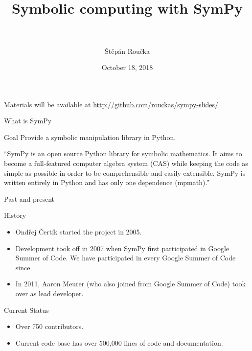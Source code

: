 \documentclass[aspectratio=169,xcolor=svgnames]{beamer}
\title[SymPy\hspace{4em}\insertframenumber/
\inserttotalframenumber]{~\\ Symbolic computing with SymPy \\~}
\author[Š. Roučka]
{Štěpán Roučka}
\institute{\pgfuseimage{mylogo}}
\date{October 18, 2018}
\begin{document}
\begin{frame}
  \maketitle
\begin{center}
\normalsize Materials will be available at \url{http://github.com/rouckas/sympy-slides/}
\end{center}
\end{frame}


\begin{frame}{What is SymPy}
  \begin{block}{Goal}
    Provide a symbolic manipulation library in Python.
  \end{block}
  \begin{block}

    ``SymPy is an open source Python library for symbolic mathematics. It aims to
    become a full-featured computer algebra system (CAS) while keeping the code as
    simple as possible in order to be comprehensible and easily extensible. SymPy
      is written entirely in Python and has only one dependence (mpmath).''

  \end{block}
\end{frame}

\begin{frame}{Past and present}
  \begin{block}{History}
    \begin{itemize}
    \item Ondřej Čertík started the project in 2005.
    \item Development took off in 2007 when SymPy first participated in Google
      Summer of Code. We have participated in every Google Summer of Code since.
    \item In 2011, Aaron Meurer (who also joined from Google Summer of Code) took
      over as lead developer.
    \end{itemize}
  \end{block}
  \begin{block}{Current Status}
    \begin{itemize}
    \item Over 750 contributors.
    \item Current code base has over 500,000 lines of code and documentation.
    \end{itemize}
  \end{block}
\end{frame}
\end{document}
